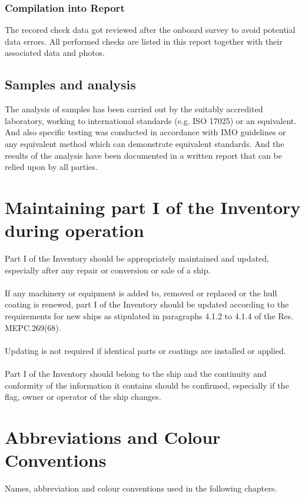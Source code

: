 \documentclass{article}
\begin{document}
\subsubsection{Compilation into Report}
The recored check data got reviewed after the onboard survey to avoid potential
data errors. All performed checks are listed in this report together with their
associated data and photos.

\subsection{Samples and analysis}
The analysis of samples has been carried out by the suitably accredited
laboratory, working to international standards (e.g. ISO 17025) or an equivalent.
And also specific testing was conducted in accordance with IMO guidelines or
any equivalent method which can demonstrate equivalent standards. And the
results of the analysis have been documented in a written report that can be
relied upon by all parties.

\section{Maintaining part I of the Inventory during operation}
Part I of the Inventory should be appropriately maintained and updated,
especially after any repair or conversion or sale of a ship. \\ \\

If any machinery or equipment is added to, removed or replaced or the hull
coating is renewed, part I of the Inventory should be updated according to the
requirements for new ships as stipulated in paragraphs 4.1.2 to 4.1.4 of the Res.
MEPC.269(68). \\ \\
Updating is not required if identical parts or coatings are installed or applied. \\ \\
Part I of the Inventory should belong to the ship and the continuity and
conformity of the information it contains should be confirmed, especially if the
flag, owner or operator of the ship changes.

\section{Abbreviations and Colour Conventions}

Names, abbreviation and colour conventions used in the following chapters.
\end{document}
